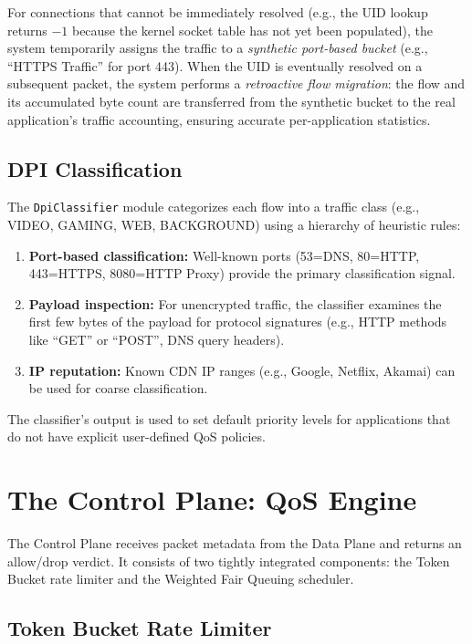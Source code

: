 For connections that cannot be immediately resolved (e.g., the UID lookup returns $-1$ because the kernel socket table has not yet been populated), the system temporarily assigns the traffic to a \textit{synthetic port-based bucket} (e.g., ``HTTPS Traffic'' for port 443). When the UID is eventually resolved on a subsequent packet, the system performs a \textit{retroactive flow migration}: the flow and its accumulated byte count are transferred from the synthetic bucket to the real application's traffic accounting, ensuring accurate per-application statistics.

\subsection{DPI Classification}

The \texttt{DpiClassifier} module categorizes each flow into a traffic class (e.g., VIDEO, GAMING, WEB, BACKGROUND) using a hierarchy of heuristic rules:

\begin{enumerate}[noitemsep]
    \item \textbf{Port-based classification:} Well-known ports (53=DNS, 80=HTTP, 443=HTTPS, 8080=HTTP Proxy) provide the primary classification signal.
    \item \textbf{Payload inspection:} For unencrypted traffic, the classifier examines the first few bytes of the payload for protocol signatures (e.g., HTTP methods like ``GET'' or ``POST'', DNS query headers).
    \item \textbf{IP reputation:} Known CDN IP ranges (e.g., Google, Netflix, Akamai) can be used for coarse classification.
\end{enumerate}

The classifier's output is used to set default priority levels for applications that do not have explicit user-defined QoS policies.

\section{The Control Plane: QoS Engine}
\label{sec:control_plane}

The Control Plane receives packet metadata from the Data Plane and returns an allow/drop verdict. It consists of two tightly integrated components: the Token Bucket rate limiter and the Weighted Fair Queuing scheduler.

\subsection{Token Bucket Rate Limiter}


